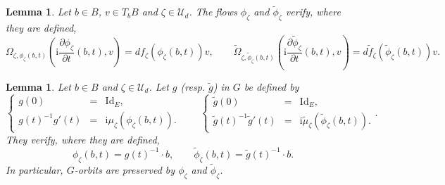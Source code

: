 \documentclass{article}
\newtheorem{lemma}[theorem]{Lemma}
\theoremstyle{remark}
\theoremstyle{definition}
\newcommand{\Id}{\mathrm{Id}}
\renewcommand{\i}{\boldsymbol{\mathrm{i}}}
\newcommand{\mU}{\mathcal{U}}
\begin{document}
\begin{lemma}\label{LEM:Flux de gradient}
    Let $b \in B$, $v \in T_bB$ and $\zeta \in \mU_d$. The flows $\phi_\zeta$ and $\tilde{\phi}_\zeta$ verify, where they are defined,
    $$
    \Omega_{\zeta,\phi_\zeta(b,t)}\left(\i\frac{\partial\phi_\zeta}{\partial t}(b,t),v\right) = df_\zeta(\phi_\zeta(b,t))v, \qquad \tilde{\Omega}_{\zeta,\tilde{\phi}_\zeta(b,t)}\left(\i\frac{\partial\tilde{\phi}_\zeta}{\partial t}(b,t),v\right) = d\tilde{f}_\zeta(\tilde{\phi}_\zeta(b,t))v.
    $$
\end{lemma}

\begin{lemma}\label{LEM:Orbite préservée}
    Let $b \in B$ and $\zeta \in \mU_d$. Let $g$ (resp. $\tilde{g}$) in $G$ be defined by
    $$
    \left\{
    \begin{array}{rcl}
        g(0) & = & \Id_E,\\
        g(t)^{-1}g'(t) & = & \i\mu_\zeta(\phi_\zeta(b,t)).
    \end{array}
    \right.
    \qquad
    \left\{
    \begin{array}{rcl}
        \tilde{g}(0) & = & \Id_E,\\
        \tilde{g}(t)^{-1}\tilde{g}'(t) & = & \i\tilde{\mu}_\zeta(\tilde{\phi}_\zeta(b,t)).
    \end{array}
    \right..
    $$
    They verify, where they are defined,
    $$
    \phi_\zeta(b,t) = g(t)^{-1} \cdot b, \qquad \tilde{\phi}_\zeta(b,t) = \tilde{g}(t)^{-1} \cdot b.
    $$
    In particular, $G$-orbits are preserved by $\phi_\zeta$ and $\tilde{\phi}_\zeta$.
\end{lemma}
\end{document}
